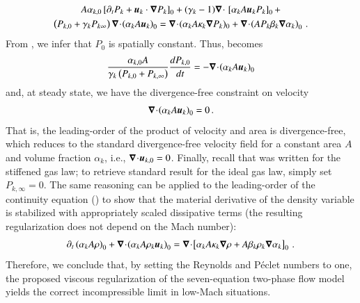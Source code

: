 %
\begin{multline}\label{eq:asympt_equ3_ener}
A \alpha_{k,0} \left[ \partial_t  P_k  + \mbold u_k \cdot \grad  P_k \right]_0 + 
(\gamma_k-1) \div \ \left[ \alpha_k A \mbold u_k P_k \right]_0 +\\ 
\left( P_{k,0} +  \gamma_k P_{k\infty} \right) \div  \left(\alpha_k A \mbold u_k \right )_0 = 
\div (\alpha_k A \kappa_k \grad P_k)_0 + \div \left( A P_k \beta_k \grad \alpha_k \right)_0 \,.
\end{multline}
%
From , we infer that $P_0$ is spatially constant. Thus,  becomes
%
\begin{equation}\label{eq:div_free_energy}
\frac{\alpha_{k,0}  A}{\gamma_k\left( P_{k,0} + P_{k,\infty} \right)} \frac{d P_{k,0}}{dt} = - \boldsymbol\nabla\! \cdot \! \left( \alpha_k A \boldsymbol u_k \right)_0 
\end{equation}
%
and, at steady state, we have the divergence-free constraint on velocity
%
\begin{equation}
\boldsymbol\nabla\! \cdot \! \left( \alpha_k A \boldsymbol u_k \right)_0  = 0 \, .
\end{equation}
%
That is, the leading-order of the product of velocity and area is divergence-free, which reduces to the standard divergence-free 
velocity field for a constant area $A$ and volume fraction $\alpha_k$, i.e., $\boldsymbol\nabla\! \cdot \! \boldsymbol u_{k,0}=0$. Finally, recall that 
 was written for the stiffened gas law; to retrieve standard result for the ideal gas law, simply set $P_{k,\infty}=0$. 
%
The same reasoning can be applied to the leading-order 
of the continuity equation () to show that the material derivative of the density variable is stabilized with 
appropriately scaled dissipative terms (the resulting regularization does not depend on the Mach number):
\begin{multline}
\partial_t \left( \alpha_k A \rho\right)_0 + \boldsymbol\nabla\! \cdot \! \left( \alpha_k A \rho_k \boldsymbol u_k \right)_0 =
\boldsymbol\nabla\! \cdot \! \left[ \alpha_k A \kappa_k \boldsymbol\nabla \rho + A \beta_k \rho_k \boldsymbol\nabla \alpha_k \right]_0 \, .
\end{multline}
%
Therefore, we conclude that, by setting the Reynolds and P\'eclet numbers to one, the proposed viscous regularization
of the seven-equation two-phase flow model yields the correct incompressible limit in low-Mach situations.
%
